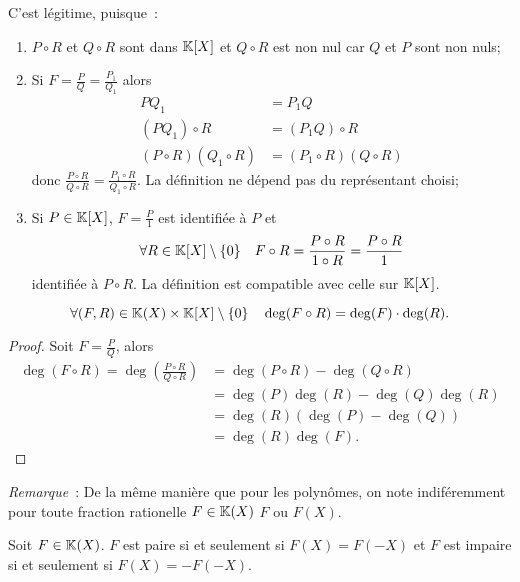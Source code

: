 C'est légitime, puisque~:
\begin{enumerate}
\item \(P \circ R\) et \(Q \circ R\) sont dans \(\mathbb{K}[X]\) et \(Q \circ R\) est non nul car \(Q\) et \(P\) sont non nuls;
\item Si \(F=\frac{P}{Q}=\frac{P_1}{Q_1}\) alors
  \begin{align}
    PQ_1&=P_1Q \\
    (PQ_1) \circ R &= (P_1Q) \circ R\\
    (P\circ R)(Q_1\circ R) &= (P_1\circ R)(Q\circ R)
  \end{align}
  donc \(\frac{P \circ R}{Q \circ R}=\frac{P_1 \circ R}{Q_1 \circ R}\). La définition ne dépend pas du représentant choisi;
\item Si \(P \in \mathbb{K}[X]\), \(F=\frac{P}{1}\) est identifiée à \(P\) et
  \begin{equation}
    \forall R \in \mathbb{K}[X]\setminus\{0\} \quad F \circ R = \frac{P \circ R}{1 \circ R}=\frac{P \circ R}{1}  
  \end{equation}
  identifiée à \(P\circ R\). La définition est compatible avec celle sur \(\mathbb{K}[X]\).
\end{enumerate}

\begin{prop}
  \begin{equation}
    \forall (F,R) \in \mathbb{K}(X)\times\mathbb{K}[X]\setminus\{0\} \quad \deg(F \circ R)=\deg(F) \cdot \deg(R).
  \end{equation}
\end{prop}
\begin{proof}
  Soit \(F=\frac{P}{Q}\), alors
  \begin{align}
    \deg(F \circ R) = \deg\left(\frac{P \circ R}{Q \circ R}\right) &= \deg(P\circ R) - \deg(Q\circ R) \\
    &=\deg(P)\deg(R)-\deg(Q)\deg(R)\\
    &=\deg(R)(\deg(P)-\deg(Q))\\
    &=\deg(R)\deg(F).
  \end{align}
\end{proof}

\emph{Remarque}~: De la même manière que pour les polynômes, on note indiféremment pour toute fraction rationelle \(F \in \mathbb{K}(X)\) \(F\) ou \(F(X)\).

\begin{defdef}
  Soit \(F \in \mathbb{K}(X)\). \(F\) est paire si et seulement si \(F(X)=F(-X)\) et \(F\) est impaire si et seulement si \(F(X)=-F(-X)\).
\end{defdef}

